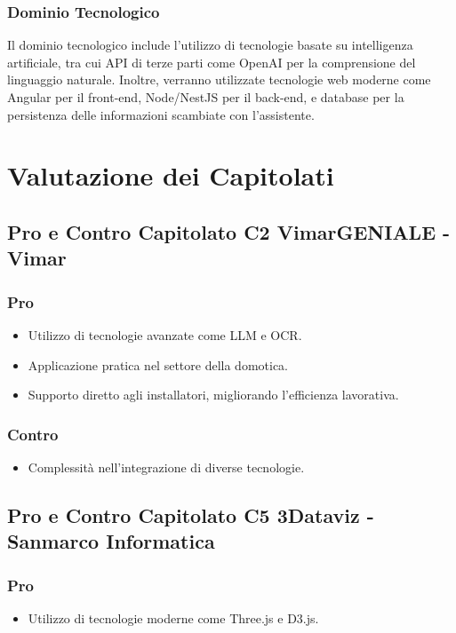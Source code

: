 \documentclass{article}
\begin{document}
\subsubsection{Dominio Tecnologico}
Il dominio tecnologico include l'utilizzo di tecnologie basate su intelligenza artificiale, 
tra cui API di terze parti come OpenAI per la comprensione del linguaggio naturale. 
Inoltre, verranno utilizzate tecnologie web moderne come Angular per il front-end, 
Node/NestJS per il back-end, e database per la persistenza delle informazioni scambiate con l'assistente.

\section{Valutazione dei Capitolati}

\subsection{Pro e Contro Capitolato C2 VimarGENIALE - Vimar}

\subsubsection{Pro}
\begin{itemize}
    \item Utilizzo di tecnologie avanzate come LLM e OCR.
    \item Applicazione pratica nel settore della domotica.
    \item Supporto diretto agli installatori, migliorando l'efficienza lavorativa.
\end{itemize}

\subsubsection{Contro}
\begin{itemize}
    \item Complessità nell'integrazione di diverse tecnologie.
\end{itemize}

\subsection{Pro e Contro Capitolato C5 3Dataviz - Sanmarco Informatica}

\subsubsection{Pro}
\begin{itemize}
    \item Utilizzo di tecnologie moderne come Three.js e D3.js.
\end{itemize}
\end{document}

